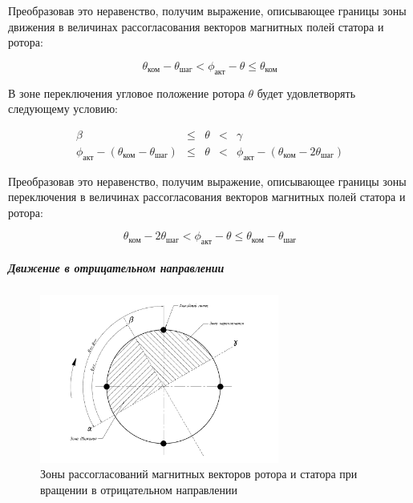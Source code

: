 Преобразовав это неравенство, получим выражение, описывающее границы зоны движения
в величинах рассогласования векторов магнитных полей статора и ротора:

\begin{equation}
    \label{movement_zone_posit_dir_for_delta}
    \theta_\textit{ком} - \theta_\textit{шаг}
    < \phi_\textit{акт} - \theta
    \leq \theta_\textit{ком}
\end{equation}

В зоне переключения угловое положение ротора $\theta$ будет удовлетворять следующему условию:

\begin{equation}
    \label{switch_zone_posit_dir_for_curr_pos}
    \begin{array}{ccccc}
        \beta & \leq & \theta & < & \gamma                                         \\
        \phi_\textit{акт} - (\theta_\textit{ком} - \theta_\textit{шаг})
        & \leq  & \theta
        & <     &\phi_\textit{акт} - (\theta_\textit{ком} - 2\theta_\textit{шаг})
    \end{array}
\end{equation}

Преобразовав это неравенство, получим выражение, описывающее границы зоны переключения
в величинах рассогласования векторов магнитных полей статора и ротора:

\begin{equation}
    \label{switch_zone_posit_dir_for_delta}
    \theta_\textit{ком} - 2\theta_\textit{шаг}
    < \phi_\textit{акт} - \theta
    \leq \theta_\textit{ком} - \theta_\textit{шаг}
\end{equation}


\subparagraph{Движение в отрицательном направлении}
\begin{figure}
    \centering
    \includegraphics[width=0.7\textwidth, keepaspectratio]
                    {./src/pictures/feedback_control/pole_switch_zones_with_negative_dir}
    \caption{Зоны рассогласований магнитных векторов ротора и статора при вращении в отрицательном направлении}
    \label{pole_switch_zones_with_negative_dir}
\end{figure}


